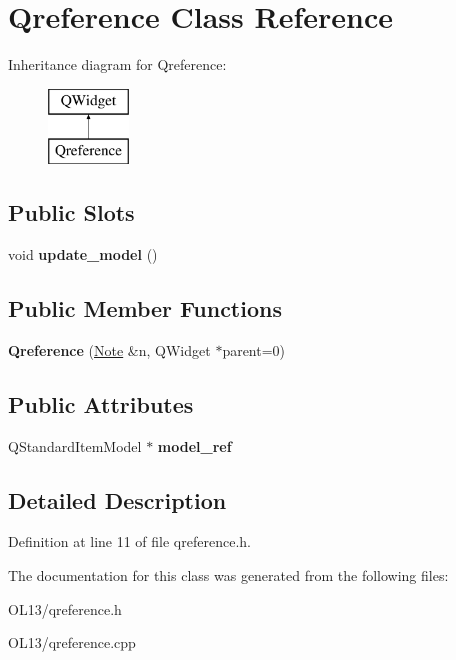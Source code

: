 \hypertarget{class_qreference}{}\section{Qreference Class Reference}
\label{class_qreference}
Inheritance diagram for Qreference\+:\begin{figure}[H]
\begin{center}
\leavevmode
\includegraphics[height=2.000000cm]{class_qreference}
\end{center}
\end{figure}
\subsection*{Public Slots}
\begin{DoxyCompactItemize}
\item 
\mbox{\label{class_qreference_af2792e095c6033fa60f5f0fe273fa6a3}} 
void {\bfseries update\+\_\+model} ()
\end{DoxyCompactItemize}
\subsection*{Public Member Functions}
\begin{DoxyCompactItemize}
\item 
\mbox{\label{class_qreference_ab95224276a2abcdd26376291da58da47}} 
{\bfseries Qreference} (\hyperlink{class_note}{Note} \&n, Q\+Widget $\ast$parent=0)
\end{DoxyCompactItemize}
\subsection*{Public Attributes}
\begin{DoxyCompactItemize}
\item 
\mbox{\label{class_qreference_aba2c9456cb52bed2104c88d0bc727ac1}} 
Q\+Standard\+Item\+Model $\ast$ {\bfseries model\+\_\+ref}
\end{DoxyCompactItemize}


\subsection{Detailed Description}


Definition at line 11 of file qreference.\+h.



The documentation for this class was generated from the following files\+:\begin{DoxyCompactItemize}
\item 
O\+L13/qreference.\+h\item 
O\+L13/qreference.\+cpp\end{DoxyCompactItemize}
